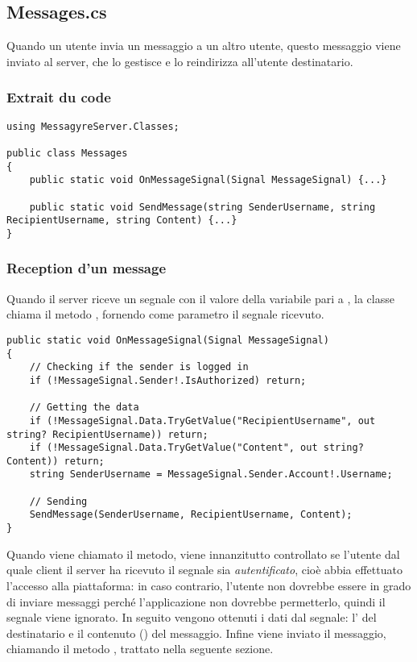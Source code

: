 \documentclass{article}
\begin{document}
\subsection{Messages.cs}

Quando un utente invia un messaggio a un altro utente, questo messaggio viene inviato al server, che lo gestisce e lo reindirizza all'utente destinatario.

\subsubsection{Extrait du code}

\begin{verbatim}
using MessagyreServer.Classes;

public class Messages
{
	public static void OnMessageSignal(Signal MessageSignal) {...}
	
	public static void SendMessage(string SenderUsername, string RecipientUsername, string Content) {...}
}
\end{verbatim}

\subsubsection{Reception d'un message}

Quando il server riceve un segnale con il valore della variabile  pari a , la classe  chiama il metodo , fornendo come parametro il segnale ricevuto.

\begin{verbatim}
public static void OnMessageSignal(Signal MessageSignal)
{
	// Checking if the sender is logged in
	if (!MessageSignal.Sender!.IsAuthorized) return;
	
	// Getting the data
	if (!MessageSignal.Data.TryGetValue("RecipientUsername", out string? RecipientUsername)) return;
	if (!MessageSignal.Data.TryGetValue("Content", out string? Content)) return;
	string SenderUsername = MessageSignal.Sender.Account!.Username;
	
	// Sending
	SendMessage(SenderUsername, RecipientUsername, Content);
}
\end{verbatim}

Quando viene chiamato il metodo, viene innanzitutto controllato se l'utente dal quale client il server ha ricevuto il segnale sia \textit{autentificato}, cioè abbia effettuato l'accesso alla piattaforma: in caso contrario, l'utente non dovrebbe essere in grado di inviare messaggi perché l'applicazione non dovrebbe permetterlo, quindi il segnale viene ignorato.
In seguito vengono ottenuti i dati dal segnale: l' del destinatario e il contenuto () del messaggio. 
Infine viene inviato il messaggio, chiamando il metodo , trattato nella seguente sezione.
\end{document}
